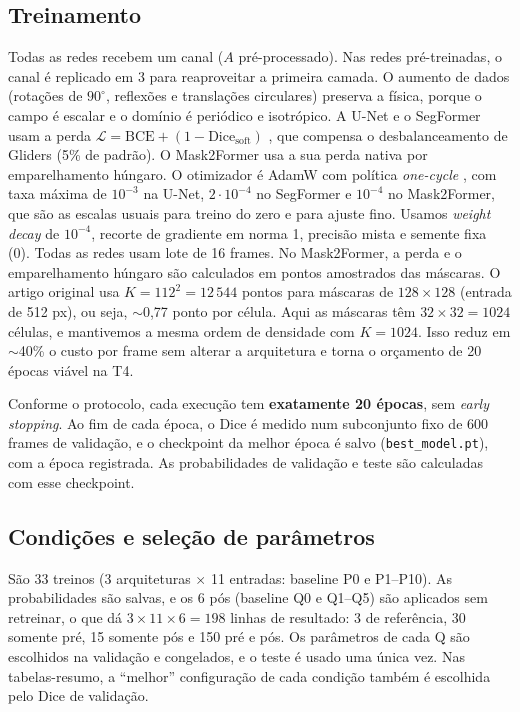 \subsection{Treinamento}
Todas as redes recebem um canal ($A$ pré-processado). Nas redes pré-treinadas, o canal é replicado
em 3 para reaproveitar a primeira camada. O aumento de dados (rotações de $90^\circ$, reflexões e
translações circulares) preserva a física, porque o campo é escalar e o domínio é periódico e
isotrópico. A U-Net e o SegFormer usam a perda
$\mathcal{L} = \mathrm{BCE} + (1-\mathrm{Dice}_{\text{soft}})$ \cite{milletari2016}, que compensa o
desbalanceamento de Gliders (5\% de padrão). O Mask2Former usa a sua perda nativa por emparelhamento
húngaro. O otimizador é AdamW \cite{loshchilov2019} com política \emph{one-cycle} \cite{smith2019},
com taxa máxima de $10^{-3}$ na U-Net, $2\cdot10^{-4}$ no SegFormer e $10^{-4}$ no Mask2Former, que
são as escalas usuais para treino do zero e para ajuste fino. Usamos \emph{weight decay} de
$10^{-4}$, recorte de gradiente em norma 1, precisão mista \cite{micikevicius2018} e semente fixa (0).
Todas as redes usam lote de 16 frames. No Mask2Former, a perda e o emparelhamento húngaro são
calculados em pontos amostrados das máscaras. O artigo original usa $K=112^2=12\,544$ pontos para
máscaras de $128\times128$ (entrada de 512 px), ou seja, $\sim$0,77 ponto por célula. Aqui as
máscaras têm $32\times32=1024$ células, e mantivemos a mesma ordem de densidade com $K=1024$. Isso
reduz em $\sim$40\% o custo por frame sem alterar a arquitetura e torna o orçamento de 20 épocas
viável na T4.

Conforme o protocolo, cada execução tem \textbf{exatamente 20 épocas}, sem \emph{early stopping}. Ao
fim de cada época, o Dice é medido num subconjunto fixo de 600 frames de validação, e o checkpoint
da melhor época é salvo (\texttt{best\_model.pt}), com a época registrada. As probabilidades de
validação e teste são calculadas com esse checkpoint.

\subsection{Condições e seleção de parâmetros}
São 33 treinos (3 arquiteturas $\times$ 11 entradas: baseline P0 e P1--P10). As probabilidades são
salvas, e os 6 pós (baseline Q0 e Q1--Q5) são aplicados sem retreinar, o que dá
$3\times11\times6 = 198$ linhas de resultado: 3 de referência, 30 somente pré, 15 somente pós e 150
pré e pós. Os parâmetros de cada Q são escolhidos na validação e congelados, e o teste é usado uma
única vez. Nas tabelas-resumo, a ``melhor'' configuração de cada condição também é escolhida pelo
Dice de validação.

